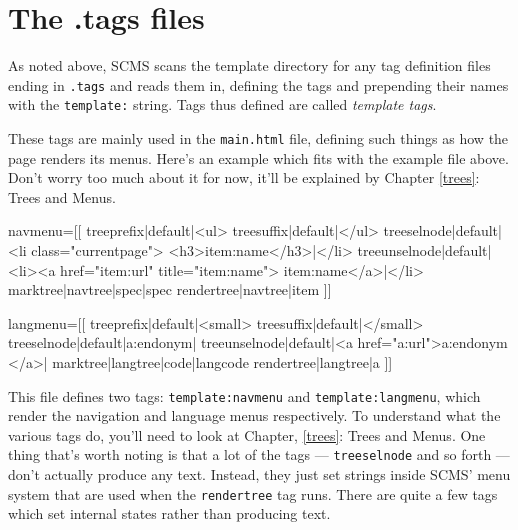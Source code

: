 \section{The .tags files}
As noted above, SCMS scans the template directory for any tag definition files
ending in \texttt{.tags} and reads them in, defining the tags and prepending
their names with the \texttt{template:} string. Tags thus defined are called
\emph{template tags}.

These tags are mainly used in the \texttt{main.html} file, defining such things as how
the page renders its menus. Here's an example which fits with the example file
above. Don't worry too much about it for now, it'll be
explained by Chapter \ref{trees}: Trees and Menus.

\begin{MyVerbatim}
navmenu=[[
{{treeprefix|default|<ul>}}
{{treesuffix|default|</ul>}}
{{treeselnode|default|
    <li class="currentpage">
    <h3>{{item:name}}</h3>|</li>}}
{{treeunselnode|default|
    <li><a href="{{item:url}}" title="{{item:name}}">
        {{item:name}}</a>|</li>}}
{{marktree|{{navtree}}|spec|{{spec}}}}
{{rendertree|{{navtree}}|item}}
]]

langmenu=[[
{{treeprefix|default|<small>}}
{{treesuffix|default|</small>}}
{{treeselnode|default|{{a:endonym}}|}}
{{treeunselnode|default|<a href="{{a:url}}">{{a:endonym}} </a>|}}
{{marktree|{{langtree}}|code|{{langcode}}}}
{{rendertree|{{langtree}}|a}}
]]
\end{MyVerbatim}

This file defines two tags: \texttt{template:navmenu} and \texttt{template:langmenu}, which render
the navigation and language menus respectively. To understand what the various tags do, you'll need to
look at Chapter, \ref{trees}: Trees and Menus. One thing that's worth noting is that a
lot of the tags --- \texttt{treeselnode} and so forth --- don't actually produce
any text. Instead, they just set strings inside SCMS' menu system that are used when the \texttt{rendertree}
tag runs. There are quite a few tags which set internal states rather than producing text.	

